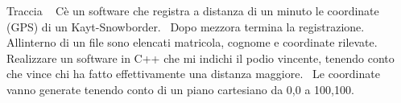 Traccia ~\newline
C\textquotesingle{}è un software che registra a distanza di un minuto le coordinate (GPS) di un Kayt-\/\+Snowborder.~\newline
Dopo mezz\textquotesingle{}ora termina la registrazione. All\textquotesingle{}interno di un file sono elencati matricola, cognome e coordinate rilevate.~\newline
Realizzare un software in C++ che mi indichi il podio vincente, tenendo conto che vince chi ha fatto effettivamente una distanza maggiore.~\newline
Le coordinate vanno generate tenendo conto di un piano cartesiano da 0,0 a 100,100.~\newline
